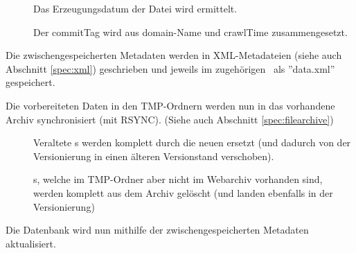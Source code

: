 \begin{description}
\begin{description}
			\item []
				Das Erzeugungsdatum der Datei wird ermittelt.
			\item []
				Der commitTag wird aus domain-Name und crawlTime zusammengesetzt.
		\end{description}
	\item [\req{Erzeugung von XML-Dateien}{xml}]
		Die zwischengespeicherten Metadaten werden in XML-Metadateien 
		(siehe auch Abschnitt \ref{spec:xml}) 
		geschrieben und jeweils im zugehörigen \arc\ als ''data.xml'' gespeichert. 
	\item [\req{Synchronisation}{sync}]
		Die vorbereiteten Daten in den TMP-Ordnern werden nun in das vorhandene Archiv synchronisiert 
		(mit RSYNC). (Siehe auch Abschnitt \ref{spec:filearchive})
		\begin{description}
			\item []
				Veraltete \arc s werden komplett durch die neuen ersetzt
				(und dadurch von der Versionierung in einen älteren Versionstand verschoben).
			\item []
				\arc s, welche im TMP-Ordner aber nicht im Webarchiv vorhanden sind, werden
				komplett aus dem Archiv gelöscht (und landen ebenfalls in der Versionierung)
		\end{description}
	\item [\req{Datenbankaktualisierung}{dbupdate}]
		Die Datenbank wird nun mithilfe der zwischengespeicherten Metadaten aktualisiert.
\end{description}

